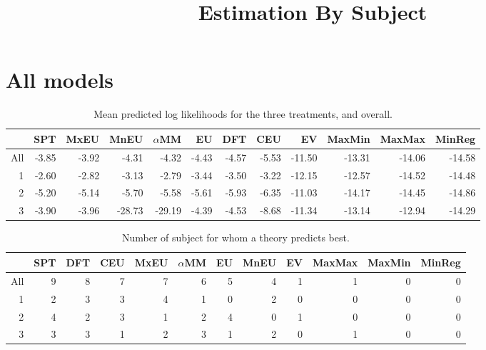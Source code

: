 \documentclass[a4paper]{article}\usepackage[]{graphicx}\usepackage[]{color}
\title{Estimation By Subject}
\begin{document}
\maketitle



\section{All models}
\label{sec:mean-pred-likel}
\label{sec:all-models}

\begin{table}[!htb]
\centering
\begin{tabular}{rrrrrrrrrrrr}
  \hline
 & SPT & MxEU & MnEU & $\alpha$MM & EU & DFT & CEU & EV & MaxMin & MaxMax & MinReg \\ 
  \hline
All & -3.85 & -3.92 & -4.31 & -4.32 & -4.43 & -4.57 & -5.53 & -11.50 & -13.31 & -14.06 & -14.58 \\ 
  1 & -2.60 & -2.82 & -3.13 & -2.79 & -3.44 & -3.50 & -3.22 & -12.15 & -12.57 & -14.52 & -14.48 \\ 
  2 & -5.20 & -5.14 & -5.70 & -5.58 & -5.61 & -5.93 & -6.35 & -11.03 & -14.17 & -14.45 & -14.86 \\ 
  3 & -3.90 & -3.96 & -28.73 & -29.19 & -4.39 & -4.53 & -8.68 & -11.34 & -13.14 & -12.94 & -14.29 \\ 
   \hline
\end{tabular}
\caption{Mean predicted log likelihoods for the three treatments, and overall.} 
\label{table1_mean_plike}
\end{table}


\begin{table}[!htb]
\centering
\begin{tabular}{rrrrrrrrrrrr}
  \hline
 & SPT & DFT & CEU & MxEU & $\alpha$MM & EU & MnEU & EV & MaxMax & MaxMin & MinReg \\ 
  \hline
All & 9 & 8 & 7 & 7 & 6 & 5 & 4 & 1 & 1 & 0 & 0 \\ 
  1 & 2 & 3 & 3 & 4 & 1 & 0 & 2 & 0 & 0 & 0 & 0 \\ 
  2 & 4 & 2 & 3 & 1 & 2 & 4 & 0 & 1 & 0 & 0 & 0 \\ 
  3 & 3 & 3 & 1 & 2 & 3 & 1 & 2 & 0 & 1 & 0 & 0 \\ 
   \hline
\end{tabular}
\caption{Number of subject for whom a theory predicts best.} 
\label{table2_winners_with_SPT}
\end{table}
\end{document}
